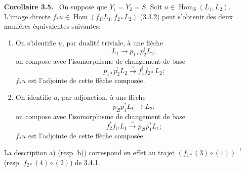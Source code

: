 \documentclass[11pt]{article}
\newenvironment{statement}[1]{\par\medskip\noindent\textbf{#1.}\ }{\par\medskip}
\DeclareMathOperator{\Hom}{Hom}
\providecommand{\Hom}{\operatorname{Hom}}
\begin{document}
\begin{statement}{Corollaire 3.5}
On suppose que $Y_1=Y_2=S$. Soit $u\in\Hom_S(L_1,L_2)$. L'image directe $f_*u\in\Hom(f_{1!}L_1,f_{2*}L_2)$ (3.3.2) peut s'obtenir des deux manières équivalentes suivantes:
\end{statement}
\begin{enumerate}[label=\alph*)]
\item On s'identifie $u$, par dualité triviale, à une flèche
\[
L_1\longrightarrow p_{1*}p_2^!L_2;
\]
on compose avec l'isomorphisme de changement de base
\[
p_{1*}p_2^!L_2\xrightarrow{\sim}f_1^!f_{2*}L_2;
\]
$f_*u$ est l'adjointe de cette flèche composée.
\item On identifie $u$, par adjonction, à une flèche
\[
p_{2!}p_1^*L_1\longrightarrow L_2;
\]
on compose avec l'isomorphisme de changement de base
\[
f_2^*f_{1!}L_1\xrightarrow{\sim}p_{2!}p_1^*L_1;
\]
$f_*u$ est l'adjointe de cette flèche composée.
\end{enumerate}
La description a) (resp. b)) correspond en effet au trajet $(f_{1*}(3)\circ(1))^{-1}$ (resp. $f_{2*}(4)\circ(2)$) de 3.4.1.
\end{document}

